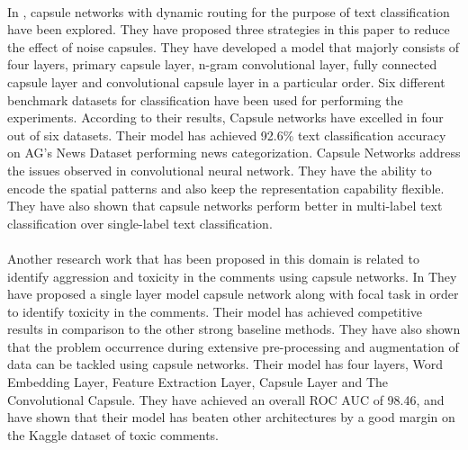 \documentclass[a4paper,12pt]{report}
\begin{document}
\paragraph{}
In \cite{Wei}, capsule networks with dynamic routing for the purpose of text classification have been explored. They have proposed three strategies in this paper to reduce the effect of noise capsules. They have developed a model that majorly consists of four layers, primary capsule layer, n-gram convolutional layer, fully connected capsule layer and convolutional capsule layer in a particular order. \cite{Wei} Six different benchmark datasets for classification have been used for performing the experiments. According to their results, Capsule networks have excelled in four out of six datasets. Their model has achieved 92.6\% text classification accuracy on AG’s News Dataset performing news categorization.
Capsule Networks address the issues observed in convolutional neural network. They have the ability to encode the spatial patterns and also keep the representation capability flexible. They have also shown that capsule networks perform better in multi-label text classification over single-label text classification.  

\paragraph{}
Another research work that has been proposed in this domain is related to identify aggression and toxicity in the comments using capsule networks. In \cite{Sri} They have proposed a single layer model capsule network along with focal task in order to identify toxicity in the comments. Their model has achieved competitive results in comparison to the other strong baseline methods. They have also shown that the problem occurrence during extensive pre-processing and augmentation of data can be tackled using capsule networks. Their model has four layers, Word Embedding Layer, Feature Extraction Layer, Capsule Layer and The Convolutional Capsule. They have achieved an overall ROC AUC of 98.46, and have shown that their model has beaten other architectures by a good margin on the Kaggle dataset of toxic comments. 
\end{document}
